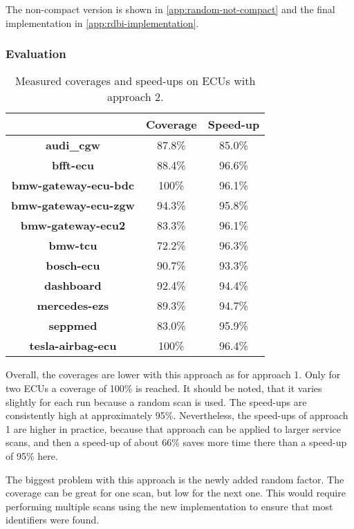 The non-compact version is shown in \autoref{app:random-not-compact} and the final implementation in \autoref{app:rdbi-implementation}.

\subsubsection{Evaluation}

\begin{table}[h]
    \begin{center}
    \begin{tabular}{ccc}
        \hline
        & \textbf{Coverage} & \textbf{Speed-up} \\
        \hline
        \textbf{audi\_cgw} & 87.8\% & 85.0\% \\
        \textbf{bfft-ecu} & 88.4\% & 96.6\% \\
        \textbf{bmw-gateway-ecu-bdc} & 100\% & 96.1\% \\
        \textbf{bmw-gateway-ecu-zgw} & 94.3\% & 95.8\% \\
        \textbf{bmw-gateway-ecu2} & 83.3\% & 96.1\% \\
        \textbf{bmw-tcu} & 72.2\% & 96.3\% \\
        \textbf{bosch-ecu} & 90.7\% & 93.3\% \\
        \textbf{dashboard} & 92.4\% & 94.4\% \\
        \textbf{mercedes-ezs} & 89.3\% & 94.7\% \\
        \textbf{seppmed} & 83.0\% & 95.9\% \\
        \textbf{tesla-airbag-ecu} & 100\% & 96.4\% \\
        \hline
    \end{tabular}
    \end{center}
    \caption{Measured coverages and speed-ups on ECUs with approach 2.}
    \label{tab:evaluation-approach2}
\end{table}

Overall, the coverages are lower with this approach as for approach 1. Only for two ECUs a coverage of 100\% is reached. It should be noted, that it varies slightly for each run because a random scan is used. The speed-ups are consistently high at approximately 95\%. Nevertheless, the speed-ups of approach 1 are higher in practice, because that approach can be applied to larger service scans, and then a speed-up of about 66\% saves more time there than a speed-up of 95\% here.

The biggest problem with this approach is the newly added random factor. The coverage can be great for one scan, but low for the next one. This would require performing multiple scans using the new implementation to ensure that most identifiers were found.


